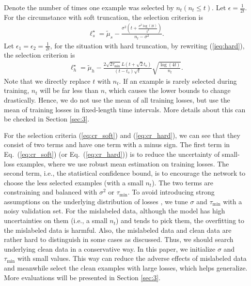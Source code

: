 \documentclass[11pt]{article}
\begin{document}
Denote the number of times one example was selected by $n_t (n_t\leq t)$. Let $\epsilon=\frac{1}{2t}$. For the circumstance with soft truncation, the selection criterion is
\vspace{-2pt}
\begin{equation}\label{eq:cr_soft}
\begin{aligned}
    \ell^{\star}_s=\tilde{\mu}_s-\frac{\sigma^2(t+\frac{\sigma^2\log(2t)}{t^2})}{n_t-\sigma^2}. 
\end{aligned}
\end{equation}
\vspace{-2pt}
Let $\epsilon_1=\epsilon_2=\frac{1}{2t}$, for the situation with hard truncation, by rewriting (\ref{ieq:hard}), the selection criterion is
\begin{equation}\label{eq:cr_hard}
\begin{aligned}
    \ell^{\star}_h=\tilde{\mu}_h-\frac{2\sqrt{2\tau_{\min}}L(t+\sqrt{2}t_\mathrm{o})}{(t-t_\mathrm{o})\sqrt{t}}\sqrt{\frac{\log(4t)}{n_t}}.
\end{aligned}
\end{equation}
Note that we directly replace $t$ with $n_t$. If an example is rarely selected during training, $n_t$ will be far less than $n$, which causes the lower bounds to change drastically. Hence, we do not use the mean of all training losses, but use the mean of training losses in fixed-length time intervals. More details about this can be checked in Section \ref{sec:3}. 

For the selection criteria (\ref{eq:cr_soft}) and (\ref{eq:cr_hard}), we can see that they consist of two terms and have one term with a minus sign. The first term in Eq.~(\ref{eq:cr_soft}) (or Eq.~(\ref{eq:cr_hard})) is to reduce the uncertainty of small-loss examples, where we use robust mean estimation on training losses. The second term, i.e., the statistical confidence bound, is to encourage the network to choose the less selected examples (with a small $n_t$). The two terms are constraining and balanced with $\sigma^2$ or $\tau_{\min}$. To avoid introducing strong assumptions on the underlying distribution of losses \citep{chakrabarty2012understanding}, we tune $\sigma$ and $\tau_{\min}$ with a noisy validation set. For the mislabeled data, although the model has high uncertainties on them (i.e., a small $n_t$) and tends to pick them, the overfitting to the mislabeled data is harmful. Also, the mislabeled data and clean data are rather hard to distinguish in some cases as discussed. Thus, we should search underlying clean data in a conservative way. In this paper, we initialize $\sigma$ and $\tau_{\min}$ with small values. This way can reduce the adverse effects of mislabeled data and meanwhile select the clean examples with large losses, which helps generalize. More evaluations will be presented in Section \ref{sec:3}.
\end{document}
